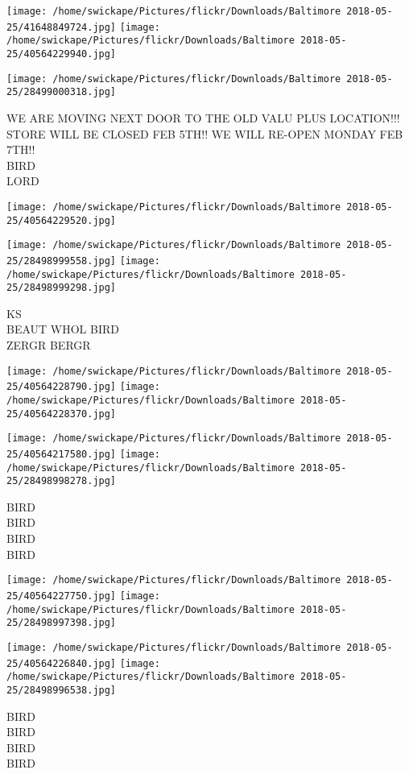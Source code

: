 \documentclass[10pt,letterpaper]{article}
\begin{document}
\texttt{[image: /home/swickape/Pictures/flickr/Downloads/Baltimore 2018-05-25/41648849724.jpg]}
\texttt{[image: /home/swickape/Pictures/flickr/Downloads/Baltimore 2018-05-25/40564229940.jpg]}

\texttt{[image: /home/swickape/Pictures/flickr/Downloads/Baltimore 2018-05-25/28499000318.jpg]}

WE ARE MOVING NEXT DOOR TO THE OLD VALU PLUS LOCATION!!! STORE WILL BE CLOSED FEB 5TH!! WE WILL RE{-}OPEN MONDAY FEB 7TH!!\\
BIRD\\
LORD
\pagebreak

\texttt{[image: /home/swickape/Pictures/flickr/Downloads/Baltimore 2018-05-25/40564229520.jpg]}

\vspace{0.25in}
\texttt{[image: /home/swickape/Pictures/flickr/Downloads/Baltimore 2018-05-25/28498999558.jpg]}
\texttt{[image: /home/swickape/Pictures/flickr/Downloads/Baltimore 2018-05-25/28498999298.jpg]}

KS\\
BEAUT WHOL BIRD\\
ZERGR BERGR
\pagebreak

\texttt{[image: /home/swickape/Pictures/flickr/Downloads/Baltimore 2018-05-25/40564228790.jpg]}
\texttt{[image: /home/swickape/Pictures/flickr/Downloads/Baltimore 2018-05-25/40564228370.jpg]}

\texttt{[image: /home/swickape/Pictures/flickr/Downloads/Baltimore 2018-05-25/40564217580.jpg]}
\texttt{[image: /home/swickape/Pictures/flickr/Downloads/Baltimore 2018-05-25/28498998278.jpg]}

BIRD\\
BIRD\\
BIRD\\
BIRD
\pagebreak

\texttt{[image: /home/swickape/Pictures/flickr/Downloads/Baltimore 2018-05-25/40564227750.jpg]}
\texttt{[image: /home/swickape/Pictures/flickr/Downloads/Baltimore 2018-05-25/28498997398.jpg]}

\texttt{[image: /home/swickape/Pictures/flickr/Downloads/Baltimore 2018-05-25/40564226840.jpg]}
\texttt{[image: /home/swickape/Pictures/flickr/Downloads/Baltimore 2018-05-25/28498996538.jpg]}

BIRD\\
BIRD\\
BIRD\\
BIRD
\pagebreak
\end{document}
